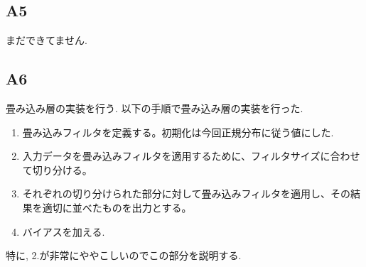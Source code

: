 \documentclass[a4paper,11pt]{jsarticle}
\begin{document}
\subsection{A5}
まだできてません.
\subsection{A6}
畳み込み層の実装を行う.
以下の手順で畳み込み層の実装を行った.
\begin{enumerate}
  \item 畳み込みフィルタを定義する。初期化は今回正規分布に従う値にした.
  \item 入力データを畳み込みフィルタを適用するために、フィルタサイズに合わせて切り分ける。
  \item それぞれの切り分けられた部分に対して畳み込みフィルタを適用し、その結果を適切に並べたものを出力とする。
  \item バイアスを加える.
\end{enumerate}
特に, 2.が非常にややこしいのでこの部分を説明する. 
\end{document}

